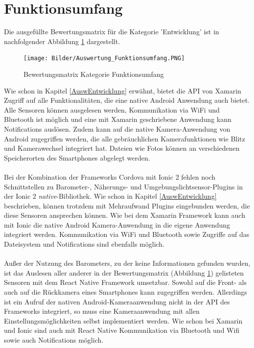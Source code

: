 \section{Funktionsumfang} \label{AuswFunktion}

Die ausgefüllte Bewertungsmatrix für die Kategorie 'Entwicklung' ist in nachfolgender Abbildung \ref{fig:AuswFunktion} dargestellt.

\begin{figure}[h]
	\centering
	\texttt{[image: Bilder/Auswertung\_Funktionsumfang.PNG]}
	\caption{Bewertungsmatrix Kategorie Funktionsumfang}
	\label{fig:AuswFunktion}
\end{figure}

Wie schon in Kapitel \ref{AuswEntwicklung} erwähnt, bietet die API von Xamarin Zugriff auf alle Funktionalitäten, die eine native Android Anwendung auch bietet. Alle Sensoren können ausgelesen werden, Kommunikation via WiFi und Bluetooth ist möglich und eine mit Xamarin geschriebene Anwendung kann Notifications auslösen. Zudem kann auf die native Kamera-Anwendung von Android zugegriffen werden, die alle gebräuchlichen Kamerafunktionen wie Blitz und Kamerawechsel integriert hat. Dateien wie Fotos können an verschiedenen Speicherorten des Smartphones abgelegt werden. 
\\
\\
Bei der Kombination der Frameworks Cordova mit Ionic 2 fehlen noch Schnittstellen zu Barometer-, Näherungs- und Umgebungslichtsensor-Plugins in der Ionic 2 \textit{native}-Bibliothek. Wie schon in Kapitel \ref{AuswEntwicklung} beschrieben, können trotzdem mit Mehraufwand Plugins eingebunden werden, die diese Sensoren ansprechen können. Wie bei dem Xamarin Framework kann auch mit Ionic die native Android Kamera-Anwendung in die eigene Anwendung integriert werden. Kommunikation via WiFi und Bluetooth sowie Zugriffe auf das Dateisystem und Notifications sind ebenfalls möglich. 
\\
\\
Außer der Nutzung des Barometers, zu der keine Informationen gefunden wurden, ist das Auslesen aller anderer in der Bewertungsmatrix (Abbildung \ref{fig:AuswFunktion}) gelisteten Sensoren mit dem React Native Framework umsetzbar. Sowohl auf die Front- als auch auf die Rückkamera eines Smartphones kann zugegriffen werden. Allerdings ist ein Aufruf der nativen Android-Kameraanwendung nicht in der API des Frameworks integriert, so muss eine Kameraanwendung mit allen Einstellungsmöglichkeiten selbst implementiert werden. Wie schon bei Xamarin und Ionic sind auch mit React Native Kommunikation via Bluetooth und Wifi sowie auch Notifications möglich. 
\clearpage

